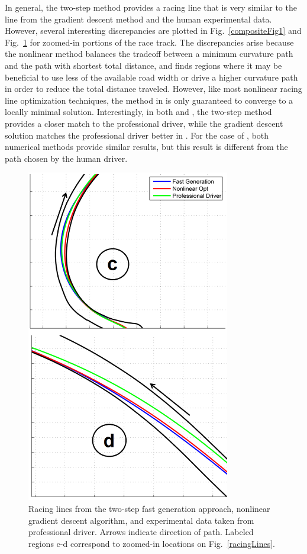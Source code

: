 \documentclass[twocolumn,10pt, final]{asme2e}
\newcommand*\circled[1]{\tikz[baseline=(char.base)]{
            \node[shape=circle,draw,inner sep=2pt] (char) {#1};}}
\begin{document}
In general, the two-step method provides a racing line that is very similar to the line from the gradient descent method
and the human experimental data. However, several interesting discrepancies are plotted
in Fig.~\ref{compositeFig1} and Fig.~\ref{compositeFig2} for zoomed-in portions of the race track. The discrepancies arise because the nonlinear method balances the tradeoff between a minimum curvature path and the path with shortest total distance,
and finds regions where it may be beneficial to use less of the available road width or drive a higher curvature path in order to reduce the total distance
traveled. However, like most nonlinear racing line optimization techniques, the method in \cite{theodosis} is only guaranteed
to converge to a locally minimal solution. Interestingly, in both \circled{b} and \circled{c}, the
two-step method provides a closer match to the professional driver, while the gradient descent solution matches the professional driver better in \circled{a}. 
For the case of \circled{d}, both numerical methods provide similar results, but this result is different from the path chosen by the human driver.



\begin{figure}
\centering
\includegraphics[width=3.5in]{figures/composite2.png}
\caption{Racing lines from the two-step fast generation approach, nonlinear gradient descent algorithm, and experimental data taken
from professional driver. Arrows indicate direction of path. Labeled regions c-d correspond to zoomed-in locations on Fig.~\ref{racingLines}. }
\label{compositeFig2}
\end{figure}
\end{document}
